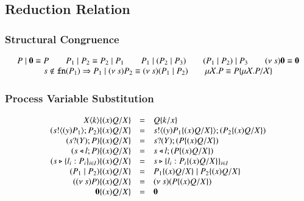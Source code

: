 \subsection{Reduction Relation}

\subsubsection{Structural Congruence}
\[
	\begin{array}{c}
		P \;|\; \mathbf{0} \equiv P \qquad P_1 \;|\; P_2 \equiv P_2 \;|\; P_1 \qquad P_1 \;|\; (P_2 \;|\; P_3)
		\qquad (P_1 \;|\; P_2) \;|\; P_3 \qquad (\nu\ s) \mathbf{0} \equiv \mathbf{0}\\
		s \notin \mathtt{fn}(P_1) \Rightarrow P_1 \;|\; (\nu\ s) P_2 \equiv (\nu\ s)(P_1 \;|\; P_2)
		\qquad \mu \mathcal{X}. P \equiv P\{\mu \mathcal{X}. P/\mathcal{X} \}
	\end{array}
\]

\subsubsection{Process Variable Substitution}
\[
	\begin{array}{rclcrcl}
			X\langle k \rangle \{(x)Q/X \} & = & Q \{k/x \} \\
		(s ! \langle (y)P_1 \rangle ; P_2) \{(x)Q/X \} &=& s ! \langle (y)P_1 \{(x)Q/X \} \rangle ; (P_2 \{(x)Q/X \}) \\
		(s ? (Y) ; P) \{(x)Q/X \} &=& s ? (Y) ; (P \{(x)Q/X \}) \\
		(s \triangleleft l ; P) \{(x)Q/X \} &=& s \triangleleft l ; (P \{(x)Q/X \})\\
		(s \triangleright \{l_i : P_i\}_{i \in I}) \{(x)Q/X \} &=& s \triangleright \{l_i : P_i \{(x)Q/X \}\}_{i \in I}\\
		(P_1 \;|\; P_2) \{(x)Q/X \} & = & P_1 \{(x)Q/X \} \;|\; P_2 \{(x)Q/X \}\\
		((\nu\ s) P) \{(x)Q/X \} & = & (\nu\ s) (P \{(x)Q/X \})\\
		\mathbf{0} \{(x)Q/X \} & = & \mathbf{0}
	\end{array}
\]

